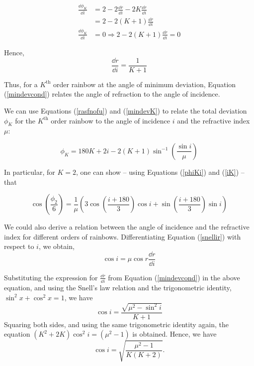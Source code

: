 \begin{refsection}
\begin{equation*}
\begin{aligned}
\frac{\dd\phi_{K}}{\dd i}&=2-2\frac{\dd r}{\dd i}-2K\frac{\dd r}{\dd i}\\
&=2-2(K+1)\frac{\dd r}{\dd i}\\
\frac{\dd \phi_{K}}{\dd i}&=0\Rightarrow2-2(K+1)\frac{\dd r}{\dd i}=0
\end{aligned}
\end{equation*}

Hence,         
\begin{equation}
    \frac{\dd r}{\dd i}=\frac{1}{K+1}
    \label{mindevcond}
\end{equation}

Thus, for a $K^\text{th}$ order rainbow at the angle of minimum deviation, Equation (\ref{mindevcond}) relates the angle of refraction to the angle of incidence. 

We can use  Equations (\ref{rasfnofu}) and (\ref{mindevK}) to relate the total deviation $\phi_K$ for the $K^\text{th}$ order rainbow to the angle of incidence $i$ and the refractive index $\mu$:
 
 \begin{equation}
     \phi_K = 180K + 2i - 2(K+1)\sin^{-1}\left(\frac{\sin i}{\mu}\right)
     \label{phiKi}
 \end{equation}

In particular, for $K = 2$, one can show -- using Equations (\ref{phiKi}) and (\ref{iK}) -- that 

\begin{equation}
   \cos\left( \frac{\phi_2}{6}\right) = \frac{1}{\mu}\left( 3 \cos\left(\frac{i + 180}{3}\right) \cos{i} + \sin\left(\frac{i + 180}{3}\right)\sin{i} \right)
\end{equation}


We could also derive a relation between the angle of incidence and the refractive index for different orders of rainbows. Differentiating Equation (\ref{snellir}) with respect to $i$, we obtain,
 \begin{equation*}
     \cos i = \mu\cos r \frac{\dd r}{\dd i}
\end{equation*}

Substituting the expression for $\frac{\dd r}{\dd i}$ from Equation (\ref{mindevcond}) in the above equation, and using the Snell's law relation and the trigonometric identity, $\sin^2 x + \cos^2 x = 1$, we have
\begin{equation}
\cos i=\frac{\sqrt{\mu^{2}-\sin^{2}i}}{K+1}
\end{equation}
Squaring both sides, and using the same trigonometric identity again, the equation $(K^2 + 2K)\cos^2 i = (\mu^2 - 1)$ is obtained.
Hence, we have
\begin{equation}
    \cos i = \sqrt{\frac{\mu^2 - 1}{K(K+2)}}.
    \label{iK}
\end{equation}
 

\end{refsection}
